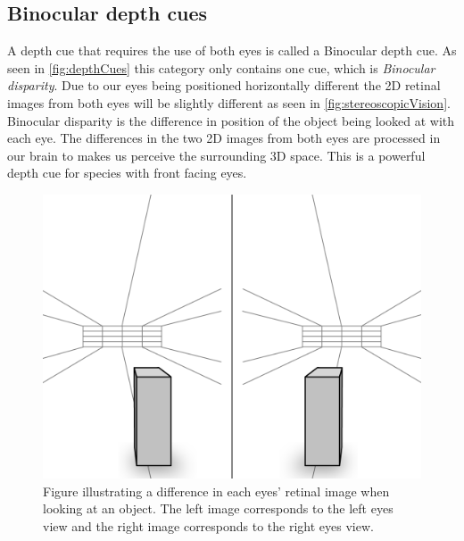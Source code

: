 \subsection{Binocular depth cues}\label{sec:binocularDepthCues}
A depth cue that requires the use of both eyes is called a Binocular depth cue. As seen in \autoref{fig:depthCues} this category only contains one cue, which is \textit{Binocular disparity}. Due to our eyes being positioned horizontally different the 2D retinal images from both eyes will be slightly different as seen in \autoref{fig:stereoscopicVision}. Binocular disparity is the difference in position of the object being looked at with each eye\citep[p.~208]{sensationPerception}. The differences in the two 2D images from both eyes are processed in our brain to makes us perceive the surrounding 3D space. This is a powerful depth cue for species with front facing eyes\citep{seeingInThreeDimensions}.
\begin{figure}[H]
	\centering
	\includegraphics[width=0.75\linewidth]{figure/Analysis/stereoScopicVision.png}
	\caption{Figure illustrating a difference in each eyes' retinal image when looking at an object. The left image corresponds to the left eyes view and the right image corresponds to the right eyes view.}
	\label{fig:stereoscopicVision}
\end{figure}


